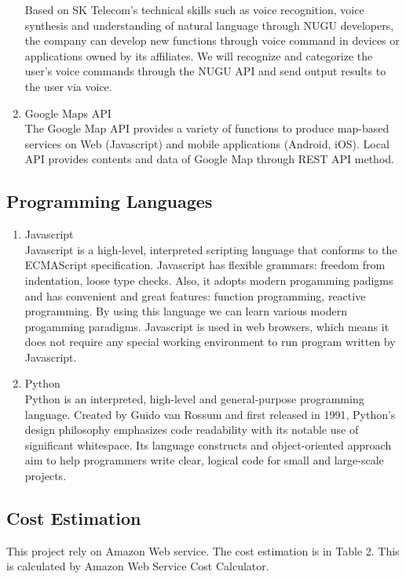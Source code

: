 \documentclass[conference]{IEEEtran}
\begin{document}
\begin{enumerate}
    Based on SK Telecom’s technical skills such as voice recognition, voice synthesis and understanding of natural language through NUGU developers, the company can develop new functions through voice command in devices or applications owned by its affiliates. We will recognize and categorize the user’s voice commands through the NUGU API and send output results to the user via voice.\\
    \item Google Maps API\\
    The Google Map API provides a variety of functions to produce map-based services on Web (Javascript) and mobile applications (Android, iOS). Local API provides contents and data of Google Map through REST API method. 
\end{enumerate}

\subsection{Programming Languages}
\begin{enumerate}
    \item Javascript\\
    Javascript is a high-level, interpreted scripting language that conforms to the ECMAScript specification. Javascript has flexible grammars: freedom from indentation, loose type checks. Also, it adopts modern progamming padigms and has convenient and great features: function programming, reactive programming. By using this language we can learn various modern progamming paradigms. Javascript is used in web browsers, which means it does not require any special working environment to run program written by Javascript.\\
    \item Python\\
    Python is an interpreted, high-level and general-purpose programming language. Created by Guido van Rossum and first released in 1991, Python's design philosophy emphasizes code readability with its notable use of significant whitespace. Its language constructs and object-oriented approach aim to help programmers write clear, logical code for small and large-scale projects.\\
\end{enumerate}

\subsection{Cost Estimation}
This project rely on Amazon Web service. The cost estimation is in Table 2. This is calculated by Amazon Web Service Cost Calculator.
\end{document}
